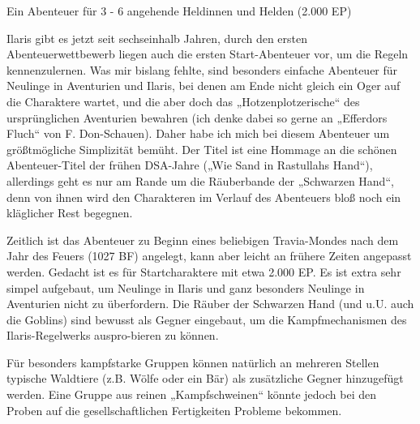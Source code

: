 


\begin{center} 
    Ein Abenteuer für 3 - 6 angehende Heldinnen und Helden (2.000 EP)
\end{center}






\neueseite
\spaltenanfang

Ilaris gibt es jetzt seit sechseinhalb Jahren, durch den ersten Abenteuerwettbewerb
liegen auch die ersten Start-Abenteuer vor, um die Regeln kennenzulernen. Was mir 
bislang fehlte, sind besonders einfache Abenteuer für Neulinge in Aventurien und Ilaris, 
bei denen am Ende nicht gleich ein Oger auf die Charaktere wartet, und die aber doch das 
„Hotzenplotzerische“ des ursprünglichen Aventurien bewahren (ich denke dabei so gerne an
„Efferdors Fluch“ von F. Don-Schauen). Daher habe ich mich bei diesem Abenteuer um
größtmögliche Simplizität bemüht. Der Titel ist eine Hommage an die schönen Abenteuer-Titel 
der frühen DSA-Jahre („Wie Sand in Rastullahs Hand“), allerdings geht es nur am Rande um die 
Räuberbande der „Schwarzen Hand“, denn von ihnen wird den Charakteren im Verlauf des Abenteuers 
bloß noch ein kläglicher Rest begegnen.



Zeitlich ist das Abenteuer zu Beginn eines beliebigen Travia-Mondes nach dem Jahr des Feuers (1027 BF)
angelegt, kann aber leicht an frühere Zeiten angepasst werden. 
Gedacht ist es für Startcharaktere mit etwa 2.000 EP. 
Es ist extra sehr simpel aufgebaut, um Neulinge in Ilaris und ganz besonders Neulinge in Aventurien 
nicht zu überfordern. Die Räuber der Schwarzen Hand (und u.U. auch die Goblins) sind  bewusst als 
Gegner eingebaut, um die Kampfmechanismen des Ilaris-Regelwerks auspro-bieren zu können. 

Für besonders kampfstarke Gruppen können natürlich an mehreren Stellen typische Waldtiere 
(z.B. Wölfe oder ein Bär) als zusätzliche Gegner hinzugefügt werden. Eine Gruppe aus reinen 
„Kampfschweinen“ könnte jedoch bei den Proben auf die gesellschaftlichen Fertigkeiten Probleme bekommen.

